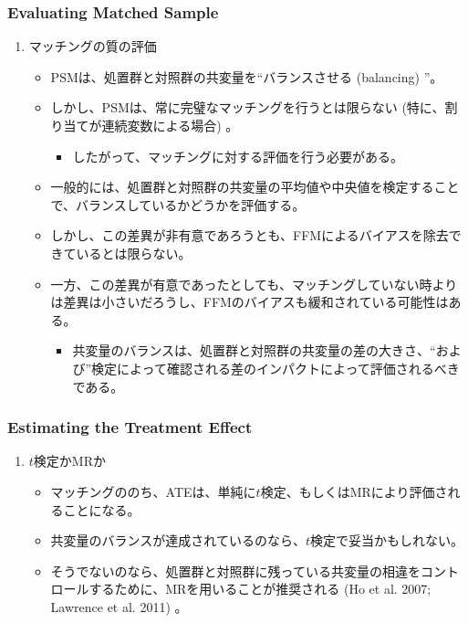 \subsubsection*{Evaluating Matched Sample}
\begin{enumerate}
 \item マッチングの質の評価
  \begin{itemize}
   \item PSMは、処置群と対照群の共変量を``バランスさせる (balancing) ''。
   \item しかし、PSMは、常に完璧なマッチングを行うとは限らない (特に、割り当てが連続変数による場合) 。
    \begin{itemize}
     \item したがって、マッチングに対する評価を行う必要がある。
    \end{itemize}
   \item 一般的には、処置群と対照群の共変量の平均値や中央値を検定することで、バランスしているかどうかを評価する。
   \item しかし、この差異が非有意であろうとも、FFMによるバイアスを除去できているとは限らない。
   \item 一方、この差異が有意であったとしても、マッチングしていない時よりは差異は小さいだろうし、FFMのバイアスも緩和されている可能性はある。
    \begin{itemize}
     \item 共変量のバランスは、処置群と対照群の共変量の差の大きさ、``および''検定によって確認される差のインパクトによって評価されるべきである。
    \end{itemize}
  \end{itemize}
\end{enumerate}
 
\subsubsection*{Estimating the Treatment Effect}
\begin{enumerate}
 \item $t$検定かMRか
   \begin{itemize}
    \item マッチングののち、ATEは、単純に$t$検定、もしくはMRにより評価されることになる。
    \item 共変量のバランスが達成されているのなら、$t$検定で妥当かもしれない。
    \item そうでないのなら、処置群と対照群に残っている共変量の相違をコントロールするために、MRを用いることが推奨される (Ho et al. 2007; Lawrence et al. 2011) 。
   \end{itemize}
\end{enumerate}
